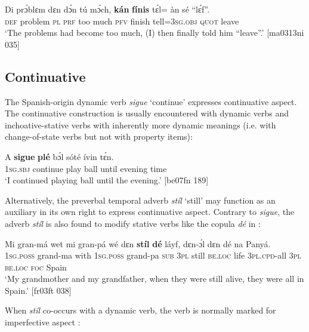 \ea%
    \label{ex:key:365}
    \gll Di  prɔ́blɛm  dɛn  dɔ́n  tú  mɔ́ch,  \textbf{kán}  \textbf{fínis}  {tɛ́l= àn}    sé    “lɛ́f”.\\
\textsc{def}  problem  \textsc{pl}  \textsc{prf}  too  much  \textsc{pfv}  finish  tell=\textsc{3sg.obj}  \textsc{quot}    leave\\

\glt ‘The problems had become too much, (I) then finally told him “leave”.’ [ma0313ni 035]
\z

\subsection{Continuative}\label{sec:6.4.4}

The Spanish-origin dynamic verb \textit{sigue} ‘continue’ expresses continuative aspect. The continuative construction is usually encountered with dynamic verbs and inchoative-stative verbs with inherently more dynamic meanings (i.e. with change-of-state verbs but not with property items): 


\ea%
    \label{ex:key:366}
    \gll A    \textbf{sigue}    \textbf{plé}    bɔ́l  sóté    ívin    tɛ́n.\\
\textsc{1sg.sbj}  continue    play    ball  until  evening  time\\

\glt ‘I continued playing ball until the evening.’ [be07fn 189]
\z

Alternatively, the preverbal temporal adverb \textit{stíl} ‘still’ may function as an auxiliary in its own right to express continuative aspect. Contrary to \textit{sigue}, the adverb \textit{stíl} is also found to modify stative verbs like the copula \textit{dé} in :


\ea%
    \label{ex:key:367}
    \gll Mi    gran-má    wet    mi    gran-pá    wé
dɛn  \textbf{stíl}  \textbf{dé}    láyf,    dɛn-ɔ́l    dɛn  dé    na  Panyá.\\
\textsc{1sg.poss}  grand-ma  with    \textsc{1sg.poss}  grand-pa    \textsc{sub}
\textsc{3pl}  still  \textsc{be.loc}   life    \textsc{3pl.cpd-}all  \textsc{3pl}  \textsc{be.loc}  \textsc{foc}  Spain\\

\glt ‘My grandmother and my grandfather, when they were still alive, 
they were all in Spain.’ [fr03ft 038]
\z

When \textit{stíl} co-occurs with a dynamic verb, the verb is normally marked for imperfective aspect :


